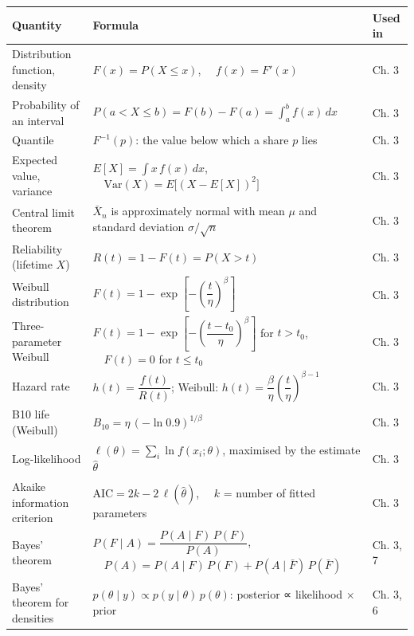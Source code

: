 \documentclass[
  letterpaper,
  DIV=11,
  numbers=noendperiod]{scrreprt}
\begin{document}
\begin{longtable}[]{@{}
  >{\raggedright\arraybackslash}p{}
  >{\raggedright\arraybackslash}p{}
  >{\raggedright\arraybackslash}p{}@{}}
\toprule\noalign{}
\begin{minipage}[b]{\linewidth}\raggedright
Quantity
\end{minipage} & \begin{minipage}[b]{\linewidth}\raggedright
Formula
\end{minipage} & \begin{minipage}[b]{\linewidth}\raggedright
Used in
\end{minipage} \\
\midrule\noalign{}
\endhead
\bottomrule\noalign{}
\endlastfoot
Distribution function, density & \(F(x) = P(X \le x)\),
\(\quad f(x) = F'(x)\) & Ch. 3 \\
Probability of an interval &
\(P(a < X \le b) = F(b) - F(a) = \int_a^b f(x)\,dx\) & Ch. 3 \\
Quantile & \(F^{-1}(p)\): the value below which a share \(p\) lies & Ch.
3 \\
Expected value, variance & \(E[X] = \int x\,f(x)\,dx\),
\(\quad \text{Var}(X) = E\big[(X - E[X])^2\big]\) & Ch. 3 \\
Central limit theorem & \(\bar X_n\) is approximately normal with mean
\(\mu\) and standard deviation \(\sigma/\sqrt{n}\) & Ch. 3 \\
Reliability (lifetime \(X\)) & \(R(t) = 1 - F(t) = P(X > t)\) & Ch. 3 \\
Weibull distribution &
\(F(t) = 1 - \exp\left[-\left(\dfrac{t}{\eta}\right)^{\beta}\right]\) &
Ch. 3 \\
Three-parameter Weibull &
\(F(t) = 1 - \exp\left[-\left(\dfrac{t - t_0}{\eta}\right)^{\beta}\right]\)
for \(t > t_0\), \(\quad F(t) = 0\) for \(t \le t_0\) & Ch. 3 \\
Hazard rate & \(h(t) = \dfrac{f(t)}{R(t)}\); Weibull:
\(h(t) = \dfrac{\beta}{\eta}\left(\dfrac{t}{\eta}\right)^{\beta - 1}\) &
Ch. 3 \\
B10 life (Weibull) & \(B_{10} = \eta\,(-\ln 0.9)^{1/\beta}\) & Ch. 3 \\
Log-likelihood & \(\ell(\theta) = \sum_i \ln f(x_i; \theta)\), maximised
by the estimate \(\hat\theta\) & Ch. 3 \\
Akaike information criterion &
\(\mathrm{AIC} = 2k - 2\,\ell(\hat\theta)\), \(\quad k\) = number of
fitted parameters & Ch. 3 \\
Bayes' theorem & \(P(F \mid A) = \dfrac{P(A \mid F)\,P(F)}{P(A)}\),
\(\quad P(A) = P(A \mid F)\,P(F) + P(A \mid \bar F)\,P(\bar F)\) & Ch.
3, 7 \\
Bayes' theorem for densities &
\(p(\theta \mid y) \propto p(y \mid \theta)\,p(\theta)\): posterior ∝
likelihood × prior & Ch. 3, 6 \\
\end{longtable}
\end{document}
